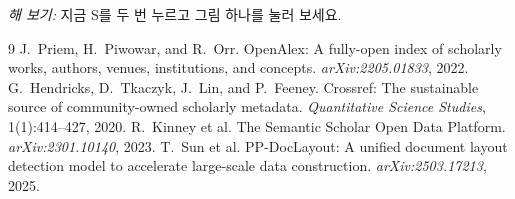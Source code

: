 \documentclass[11pt]{article}
\begin{document}
\noindent\emph{해 보기:} 지금 \textsf{S}를 두 번 누르고 그림 하나를 눌러 보세요.

\begin{thebibliography}{9}
 J.~Priem, H.~Piwowar, and R.~Orr. OpenAlex: A fully-open
index of scholarly works, authors, venues, institutions, and concepts.
\emph{arXiv:2205.01833}, 2022.
 G.~Hendricks, D.~Tkaczyk, J.~Lin, and P.~Feeney. Crossref:
The sustainable source of community-owned scholarly metadata.
\emph{Quantitative Science Studies}, 1(1):414--427, 2020.
 R.~Kinney et al. The Semantic Scholar Open Data Platform.
\emph{arXiv:2301.10140}, 2023.
 T.~Sun et al. PP-DocLayout: A unified document layout
detection model to accelerate large-scale data construction.
\emph{arXiv:2503.17213}, 2025.
\end{thebibliography}
\end{document}
